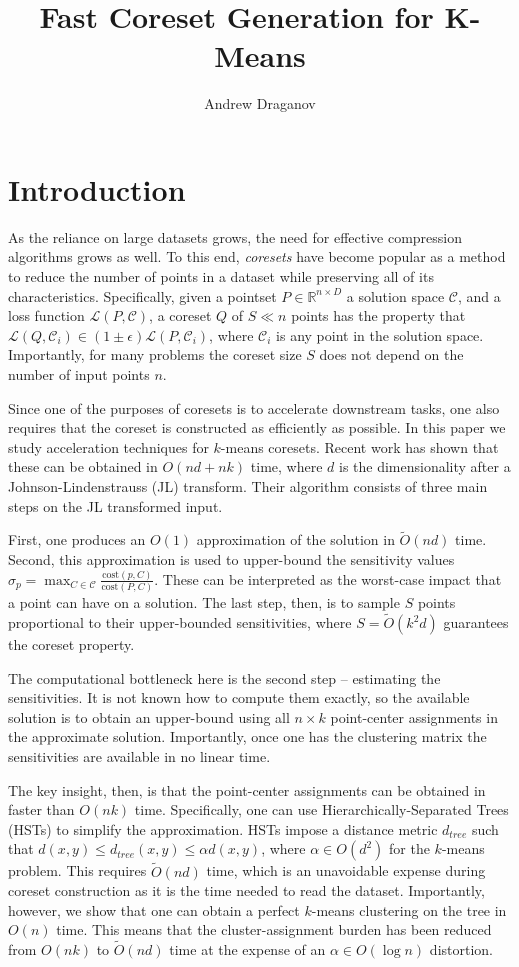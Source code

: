 \documentclass{article}
\title{Fast Coreset Generation for K-Means}
\author{Andrew Draganov}
\theoremstyle{definition}
\begin{document}
\maketitle

\section{Introduction}

As the reliance on large datasets grows, the need for effective compression algorithms grows as well. To this end, \emph{coresets} have become popular as
a method to reduce the number of points in a dataset while preserving all of its characteristics. Specifically, given a pointset $P \in \mathbb{R}^{n \times D}$
a solution space $\mathcal{C}$, and a loss function $\mathcal{L}(P, \mathcal{C})$, a coreset $Q$ of $S \ll n$ points has the property that $\mathcal{L}(Q,
\mathcal{C}_i) \in (1 \pm \epsilon) \mathcal{L}(P, \mathcal{C}_i)$, where $\mathcal{C}_i$ is any point in the solution space. Importantly, for many problems the
coreset size $S$ does not depend on the number of input points $n$. 

Since one of the purposes of coresets is to accelerate downstream tasks, one also requires that the coreset is constructed as efficiently as possible.  In this
paper we study acceleration techniques for $k$-means coresets. Recent work has shown that these can be obtained in $O(nd + nk)$ time, where $d$ is the
dimensionality after a Johnson-Lindenstrauss (JL) transform. Their algorithm consists of three main steps on the JL transformed input.

First, one produces an $O(1)$ approximation of the solution in $\tilde{O}(nd)$ time. Second, this approximation is used to upper-bound
the sensitivity values $\sigma_p = \max_{C \in \mathcal{C}} \frac{\text{cost}(p, C)}{\text{cost}(P, C)}$. These can be interpreted as the worst-case impact that
a point can have on a solution. The last step, then, is to sample $S$ points proportional to their upper-bounded sensitivities, where $S = \tilde{O}(k^2 d)$
guarantees the coreset property.

The computational bottleneck here is the second step -- estimating the sensitivities. It is not known how to compute them exactly, so the available solution is
to obtain an upper-bound using all $n \times k$ point-center assignments in the approximate solution. Importantly, once one has the clustering matrix the
sensitivities are available in no linear time.

The key insight, then, is that the point-center assignments can be obtained in faster than $O(nk)$ time. Specifically, one can use Hierarchically-Separated
Trees (HSTs) to simplify the approximation. HSTs impose a distance metric $d_{tree}$ such that $d(x, y) \leq d_{tree}(x, y) \leq \alpha d(x, y)$, where $\alpha
\in O(d^2)$ for the $k$-means problem. This requires $\tilde{O}(nd)$ time, which is an unavoidable expense during coreset construction as it is the time needed
to read the dataset.  Importantly, however, we show that one can obtain a perfect $k$-means clustering on the tree in $O(n)$ time. This means that the
cluster-assignment burden has been reduced from $O(nk)$ to $\tilde{O}(nd)$ time at the expense of an $\alpha \in O(\log n)$ distortion.
\end{document}
